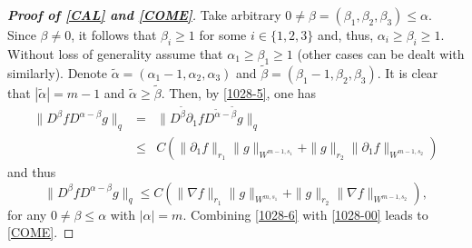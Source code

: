 \documentclass[12pt,reqno]{amsart}
\numberwithin{equation}{section}
\begin{document}
\begin{proof}[\textbf{Proof of \eqref{CAL} and \eqref{COME}}]
Take arbitrary $0\not=\beta=(\beta_1,\beta_2,\beta_3)\leq\alpha$. Since $\beta\not=0$, it follows that $\beta_i\geq1$ for some $i\in\{1,2,3\}$ and, thus,
$\alpha_i\geq\beta_i\geq1$.
Without loss of generality assume that $\alpha_1\geq\beta_1\geq1$ (other cases can be dealt with similarly).
Denote $\tilde\alpha=(\alpha_1-1,\alpha_2,\alpha_3)$ and $\tilde\beta=(\beta_1-1,\beta_2,\beta_3)$. It is clear that $|\tilde\alpha|=m-1$ and $\tilde\alpha\geq\tilde\beta$. Then,
by \eqref{1028-5}, one has
\begin{eqnarray}
  \|D^\beta fD^{\alpha-\beta}g\|_q&=&\|D^{\tilde\beta}\partial_1fD^{\tilde\alpha-\tilde\beta}g\|_q \nonumber\\
  &\leq& C\left(\|\partial_1f\|_{r_1}\|g\|_{W^{m-1, s_1}}+\|g\|_{r_2}\|\partial_1f\|_{W^{m-1,s_2}}\right)\nonumber
\end{eqnarray}
and thus
\begin{equation}
  \label{1028-6}
  \|D^\beta fD^{\alpha-\beta}g\|_q \leq C\left(\|\nabla f\|_{r_1}\|g\|_{W^{m, s_1}}+\|g\|_{r_2}\|\nabla f\|_{W^{m-1,s_2}}\right),
\end{equation}
for any $0\not=\beta\leq\alpha$ with $|\alpha|=m$. Combining \eqref{1028-6} with \eqref{1028-00} leads to \eqref{COME}.
\end{proof}
\end{document}
